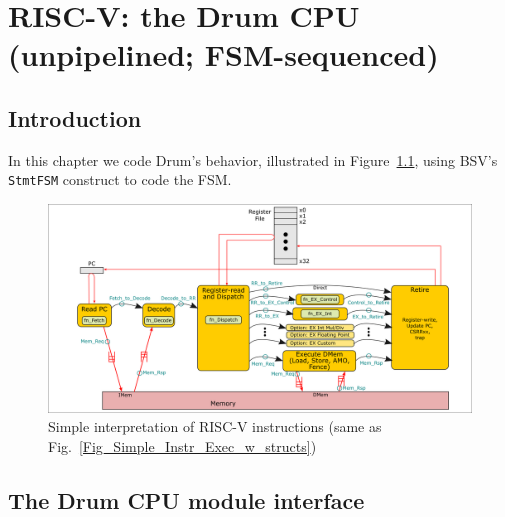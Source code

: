 

\chapter{RISC-V: the Drum CPU \\
(unpipelined; FSM-sequenced)}


\setcounter{page}{1}
\renewcommand{\thepage}{\arabic{chapter}-\arabic{page}}

\label{ch_Drum_code}


\section{Introduction}

In this chapter we code Drum's behavior, illustrated in
Figure~\ref{Fig_Drum_Instr_Exec}, using BSV's \verb|StmtFSM|
construct to code the FSM.
\begin{figure}[htbp]
  \centerline{\includegraphics[width=6in,angle=0]{Figures/Fig_Instr_Exec_w_structs}}
  \caption{\label{Fig_Drum_Instr_Exec}
           Simple interpretation of RISC-V instructions
	   (same as Fig.~\ref{Fig_Simple_Instr_Exec_w_structs})}
\end{figure}


\section{The Drum CPU module interface}

